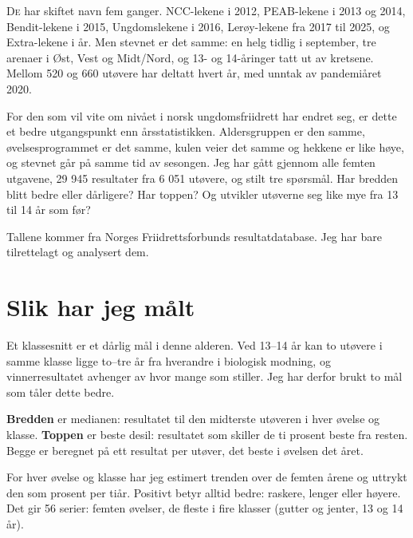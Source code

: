 
\lettrine[lines=3]{D}{e} har skiftet navn fem ganger. NCC-lekene i 2012, PEAB-lekene i 2013 og 2014, Bendit-lekene i 2015, Ungdomslekene i 2016, Lerøy-lekene fra 2017 til 2025, og Extra-lekene i år. Men stevnet er det samme: en helg tidlig i september, tre arenaer i Øst, Vest og Midt/Nord, og 13- og 14-åringer tatt ut av kretsene. Mellom 520 og 660 utøvere har deltatt hvert år, med unntak av pandemiåret 2020.

For den som vil vite om nivået i norsk ungdomsfriidrett har endret seg, er dette et bedre utgangspunkt enn årsstatistikken. Aldersgruppen er den samme, øvelsesprogrammet er det samme, kulen veier det samme og hekkene er like høye, og stevnet går på samme tid av sesongen. Jeg har gått gjennom alle femten utgavene, 29 945 resultater fra 6 051 utøvere, og stilt tre spørsmål. Har bredden blitt bedre eller dårligere? Har toppen? Og utvikler utøverne seg like mye fra 13 til 14 år som før?

Tallene kommer fra Norges Friidrettsforbunds resultatdatabase. Jeg har bare tilrettelagt og analysert dem.

\section{Slik har jeg målt}\label{slik-har-jeg-muxe5lt}

Et klassesnitt er et dårlig mål i denne alderen. Ved 13--14 år kan to utøvere i samme klasse ligge to--tre år fra hverandre i biologisk modning, og vinnerresultatet avhenger av hvor mange som stiller. Jeg har derfor brukt to mål som tåler dette bedre.

\textbf{Bredden} er medianen: resultatet til den midterste utøveren i hver øvelse og klasse. \textbf{Toppen} er beste desil: resultatet som skiller de ti prosent beste fra resten. Begge er beregnet på ett resultat per utøver, det beste i øvelsen det året.

For hver øvelse og klasse har jeg estimert trenden over de femten årene og uttrykt den som prosent per tiår. Positivt betyr alltid bedre: raskere, lenger eller høyere. Det gir 56 serier: femten øvelser, de fleste i fire klasser (gutter og jenter, 13 og 14 år).

